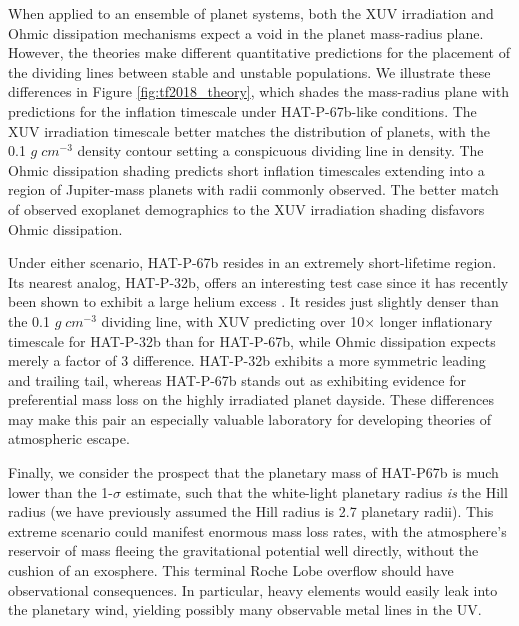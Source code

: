 \documentclass[twocolumn]{aastex631}
\begin{document}
When applied to an ensemble of planet systems, both the XUV irradiation and Ohmic dissipation mechanisms expect a void in the planet mass-radius plane. However, the theories make different quantitative predictions for the placement of the dividing lines between stable and unstable populations.  We illustrate these differences in Figure \ref{fig:tf2018_theory}, which shades the mass-radius plane with predictions for the inflation timescale under HAT-P-67b-like conditions.  The XUV irradiation timescale better matches the distribution of planets, with the 0.1 $g\;cm^{-3}$ density contour setting a conspicuous dividing line in density.  The Ohmic dissipation shading predicts short inflation timescales extending into a region of Jupiter-mass planets with radii commonly observed.  The better match of observed exoplanet demographics to the XUV irradiation shading disfavors Ohmic dissipation.  

Under either scenario, HAT-P-67b resides in an extremely short-lifetime region.  Its nearest analog, HAT-P-32b, offers an interesting test case since it has recently been shown to exhibit a large helium excess .  It resides just slightly denser than the 0.1 $g\;cm^{-3}$ dividing line, with XUV predicting over 10$\times$ longer inflationary timescale for HAT-P-32b than for HAT-P-67b, while Ohmic dissipation expects merely a factor of 3 difference.  HAT-P-32b exhibits a more symmetric leading and trailing tail, whereas HAT-P-67b stands out as exhibiting evidence for preferential mass loss on the highly irradiated planet dayside.  These differences may make this pair an especially valuable laboratory for developing theories of atmospheric escape.

Finally, we consider the prospect that the planetary mass of HAT-P67b is much lower than the 1-$\sigma$ estimate, such that the white-light planetary radius \emph{is} the Hill radius (we have previously assumed the Hill radius is 2.7 planetary radii).  This extreme scenario could manifest enormous mass loss rates, with the atmosphere's reservoir of mass fleeing the gravitational potential well directly, without the cushion of an exosphere.  This terminal Roche Lobe overflow should have observational consequences.  In particular, heavy elements would easily leak into the planetary wind, yielding possibly many observable metal lines in the UV.
\end{document}
